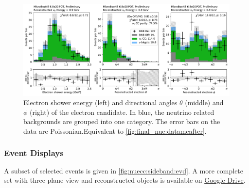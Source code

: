 \begin{figure}[htb] 
    \centering
    \includegraphics[height=0.27\textheight]{Sidebands/Figures/nuecc/run123/event_e_kinematics.pdf}
\caption{\label{fig:nuecc:sideband:e_kinematics} Electron shower energy (left) and directional angles $\theta$ (middle) and $\phi$ (right) of the \nuecc electron candidate. In blue, the neutrino related backgrounds are grouped into one category. The error bars on the data are Poissonian.Equivalent to \cref{fig:final_nue:datamcafter}.}
\end{figure}

\subsubsection{Event Displays}

A subset of selected events is given in \cref{fig:nuecc:sideband:evd}. A more complete set with three plane view and reconstructed objects is available on \href{https://drive.google.com/drive/folders/1_zV1V4MbLB0MO1aP-VNPCGC1d0QatSU8?usp=sharing}{Google Drive}.

